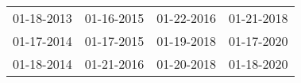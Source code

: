 \begin{supertabular}{llll}
 01-18-2013 &  01-16-2015 &  01-22-2016 &  01-21-2018 \\
 01-17-2014 &  01-17-2015 &  01-19-2018 &  01-17-2020 \\
 01-18-2014 &  01-21-2016 &  01-20-2018 &  01-18-2020 \\
\end{supertabular}
